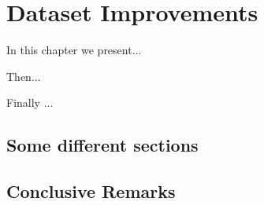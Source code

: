 \chapter{Dataset Improvements}
\label{chap:Improvements}
\thispagestyle{plain}
\vspace{0.5cm}

\noindent In this chapter we present...

Then...

Finally ...


\section{Some different sections}

\section{Conclusive Remarks}
